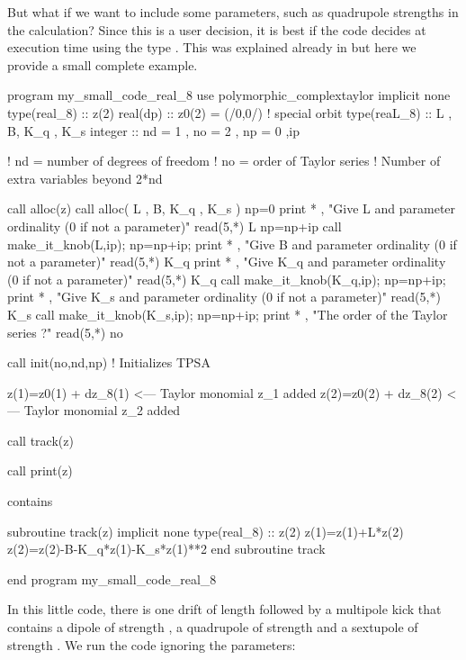 \documentclass[english,12pt,article]{article} %
\begin{document}
But what if we want to include some parameters, such as quadrupole strengths in the calculation? Since this is a user decision, it is best if the code decides at execution time using the type  .  This was explained already  in  but here we provide a small complete example.

\begin{code}
program my_small_code_real_8
use polymorphic_complextaylor
implicit none
type(real_8) :: z(2)  
real(dp) :: z0(2) = (/0,0/)  ! special orbit
type(reaL_8)  :: L , B, K_q , K_s 
integer :: nd = 1 , no = 2 , np = 0 ,ip

! nd = number of degrees of freedom
! no =  order of Taylor series
! Number of extra variables beyond 2*nd

call alloc(z)
call alloc( L , B, K_q , K_s )
np=0
print * , "Give  L and parameter ordinality (0 if not a parameter)"
read(5,*) L%
np=np+ip
call make_it_knob(L,ip);  np=np+ip;
print * , "Give  B  and parameter ordinality (0 if not a parameter)"
read(5,*) K_q%
print * , "Give  K_q and parameter ordinality (0 if not a parameter)"
read(5,*) K_q%
call make_it_knob(K_q,ip);  np=np+ip;
print * , "Give  K_s and parameter ordinality (0 if not a parameter)"
read(5,*) K_s%
call make_it_knob(K_s,ip); np=np+ip;
print * , "The order of the Taylor series ?"
read(5,*) no

call init(no,nd,np) ! Initializes TPSA 

z(1)=z0(1) + dz_8(1) <--- Taylor monomial z_1 added
z(2)=z0(2) + dz_8(2) <--- Taylor monomial z_2 added

call track(z)

call print(z)

contains

subroutine track(z)
implicit none
type(real_8) :: z(2) 
 z(1)=z(1)+L*z(2) 
 z(2)=z(2)-B-K_q*z(1)-K_s*z(1)**2 
end subroutine track

end program my_small_code_real_8
\end{code}

In this little code, there is one drift of length  followed by a multipole kick that contains a dipole of strength , a quadrupole of strength  and a sextupole of strength . We run the code ignoring the parameters:
\end{document}
